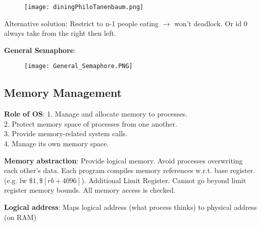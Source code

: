 \documentclass[a4paper,landscape]{article}
\newcommand{\rntopic}[1]{\vspace{-1.5em}\subsection*{#1}\vspace{-0.5em}}
\newcommand{\rnname}[1]{\textbf{#1}}
\begin{document}
\begin{multicols*}{4}
\begin{flatitemize}
    \begin{figure}[H]
      \texttt{[image: diningPhiloTanenbaum.png]}
    \end{figure}
    \vspace{-1.5em}
Alternative solution: Restrict to n-1 people eating $\rightarrow$ won't deadlock. Or id 0 always take from the right then left.
\item \rnname{General Semaphore}:
    \vspace{-1.5em}
    \begin{figure}[H]
      \texttt{[image: General\_Semaphore.PNG]}
    \end{figure}
    \vspace{-1.5em}

\end{flatitemize}
\rntopic{Memory Management}
\begin{flatitemize}
\item \rnname{Role of OS}:
1. Manage and allocate memory to processes.\\
2. Protect memory space of processes from one another. \\
3. Provide memory-related system calls.\\
4. Manage its own memory space.
\item \rnname{Memory abstraction}: Provide logical memory. Avoid processes overwriting each other's data. Each program compiles memory references w.r.t. base register. (e.g. lw $ \$ 1, \$ [rb+4096] $). Additional Limit Register. Cannot go beyond limit register memory bounds. All memory access is checked.
\item \rnname{Logical address}: Maps logical address (what process thinks) to physical address (on RAM)


\end{flatitemize}
\end{multicols*}
\end{document}
